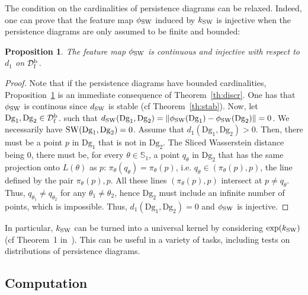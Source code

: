 \documentclass[11pt]{article}
\newcommand{\Dg}{\mathrm{Dg}}
\newcommand{\kSW}{k_{\rm SW}}
\newcommand{\SpfbD}{{\mathcal D}_{\rm f}^{\rm b}}
\newtheorem{prop}[thm]{Proposition}
\begin{document}
The condition on the cardinalities of persistence diagrams can be relaxed. Indeed, one can prove that the feature map $\phi_{\rm SW}$ induced by $\kSW$ 
is injective when the persistence diagrams are only assumed to be finite and bounded:

\begin{prop}\label{prop:inj}
The feature map $\phi_{\rm SW}$ is continuous and injective with respect to $d_1$ on $\SpfbD$.
\end{prop}	

\begin{proof}
Note that if the persistence diagrams have bounded cardinalities, Proposition~\ref{prop:inj} is an immediate consequence of Theorem~\ref{th:discr}.
One has that $\phi_{\rm SW}$ is continous since $d_{\rm SW}$ is stable (cf Theorem~\ref{th:stab}).
Now, let $\Dg_1,\Dg_2\in \SpfbD$. such that  $d_{\rm SW}(\Dg_1,\Dg_2)=\|\phi_{\rm SW}(\Dg_1)-\phi_{\rm SW}(\Dg_2)\|=0$. 
We necessarily have ${\rm SW}(\Dg_1,\Dg_2)=0$.
Assume that $d_1(\Dg_1,\Dg_2)>0$. 
Then, there must be a point $p$ in $\Dg_1$ that is not in $\Dg_2$.
The Sliced Wasserstein distance being $0$, there must be, for every $\theta\in\mathbb{S}_1$, a point $q_\theta$ in $\Dg_2$ 
that has the same projection onto $L(\theta)$ as $p$: $\pi_\theta(q_\theta)=\pi_\theta(p)$, i.e. 
$q_\theta\in(\pi_\theta(p),p)$, the line defined by the pair $\pi_\theta(p),p$. 
All these lines $(\pi_\theta(p),p)$ intersect at $p\neq q_\theta$.
Thus, $q_{\theta_1}\neq q_{\theta_2}$ for any $\theta_1\neq \theta_2$, hence $\Dg_2$
must include an infinite number of points,
which is impossible. Thus, $d_1(\Dg_1,\Dg_2)=0$ and $\phi_{\rm SW}$ is injective. 

\end{proof}

In particular, $\kSW$ can be turned into a universal kernel by considering ${\rm exp}(\kSW)$  (cf Theorem~1 in~\cite{Kwitt15}).
This can be useful in a variety of tasks, including tests on distributions of persistence diagrams.


\subsection{Computation}\label{sec:comput}
\end{document}
